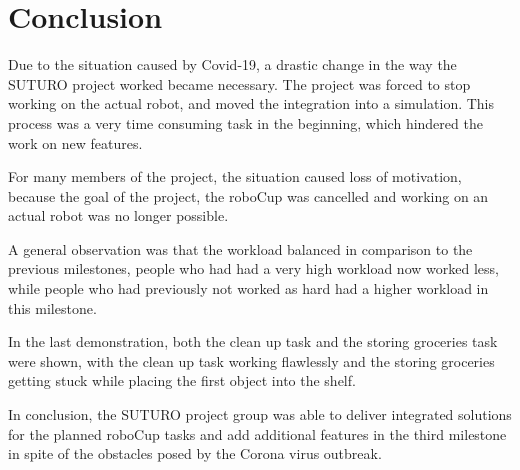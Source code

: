 \documentclass[main.tex]{subfiles}
\begin{document}
	
	\chapter{Conclusion}
	Due to the situation caused by Covid-19, a drastic change in the way the SUTURO project worked became necessary.  The project was forced to stop working on the actual robot, and moved the integration into a simulation. This process was a very time consuming task in the beginning, which hindered the work on new features.
	
	For many members of the project, the situation caused loss of motivation, because the goal of the project, the roboCup was cancelled and working on an actual robot was no longer possible. 
	
	A general observation was that the workload balanced in comparison to the previous milestones, people who had had a very high workload now worked less, while people who had previously not worked as hard had a higher workload in this milestone.
	
	In the last demonstration, both the clean up task and the storing groceries task were shown, with the clean up task working flawlessly and the storing groceries getting stuck while placing the first object into the shelf.
	
	In conclusion, the SUTURO project group was able to deliver integrated solutions for the planned roboCup tasks and add additional features in the third milestone in spite of the obstacles posed by the Corona virus outbreak. 


	
\end{document}
